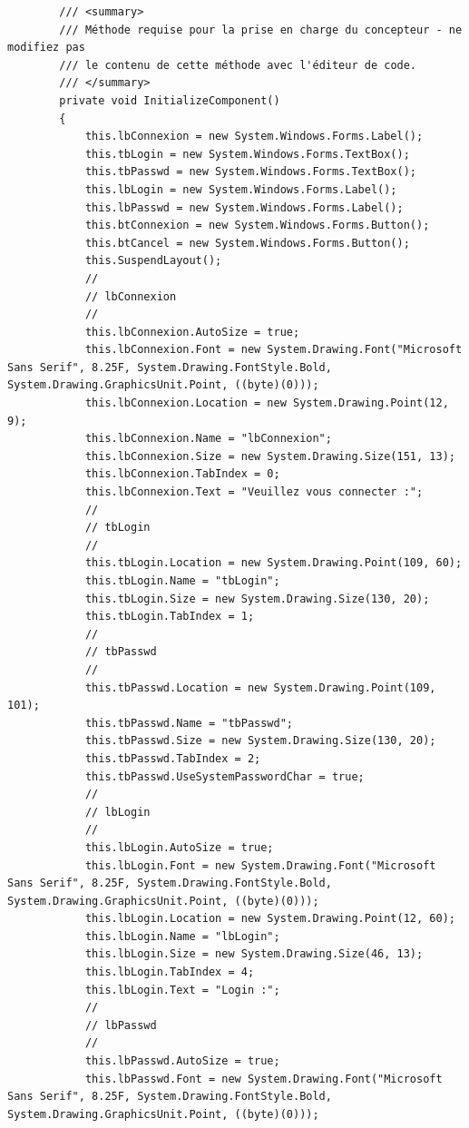 \documentclass[main.tex]{subfiles}
\begin{document}
\begin{lstlisting}
        /// <summary>
        /// Méthode requise pour la prise en charge du concepteur - ne modifiez pas
        /// le contenu de cette méthode avec l'éditeur de code.
        /// </summary>
        private void InitializeComponent()
        {
            this.lbConnexion = new System.Windows.Forms.Label();
            this.tbLogin = new System.Windows.Forms.TextBox();
            this.tbPasswd = new System.Windows.Forms.TextBox();
            this.lbLogin = new System.Windows.Forms.Label();
            this.lbPasswd = new System.Windows.Forms.Label();
            this.btConnexion = new System.Windows.Forms.Button();
            this.btCancel = new System.Windows.Forms.Button();
            this.SuspendLayout();
            // 
            // lbConnexion
            // 
            this.lbConnexion.AutoSize = true;
            this.lbConnexion.Font = new System.Drawing.Font("Microsoft Sans Serif", 8.25F, System.Drawing.FontStyle.Bold, System.Drawing.GraphicsUnit.Point, ((byte)(0)));
            this.lbConnexion.Location = new System.Drawing.Point(12, 9);
            this.lbConnexion.Name = "lbConnexion";
            this.lbConnexion.Size = new System.Drawing.Size(151, 13);
            this.lbConnexion.TabIndex = 0;
            this.lbConnexion.Text = "Veuillez vous connecter :";
            // 
            // tbLogin
            // 
            this.tbLogin.Location = new System.Drawing.Point(109, 60);
            this.tbLogin.Name = "tbLogin";
            this.tbLogin.Size = new System.Drawing.Size(130, 20);
            this.tbLogin.TabIndex = 1;
            // 
            // tbPasswd
            // 
            this.tbPasswd.Location = new System.Drawing.Point(109, 101);
            this.tbPasswd.Name = "tbPasswd";
            this.tbPasswd.Size = new System.Drawing.Size(130, 20);
            this.tbPasswd.TabIndex = 2;
            this.tbPasswd.UseSystemPasswordChar = true;
            // 
            // lbLogin
            // 
            this.lbLogin.AutoSize = true;
            this.lbLogin.Font = new System.Drawing.Font("Microsoft Sans Serif", 8.25F, System.Drawing.FontStyle.Bold, System.Drawing.GraphicsUnit.Point, ((byte)(0)));
            this.lbLogin.Location = new System.Drawing.Point(12, 60);
            this.lbLogin.Name = "lbLogin";
            this.lbLogin.Size = new System.Drawing.Size(46, 13);
            this.lbLogin.TabIndex = 4;
            this.lbLogin.Text = "Login :";
            // 
            // lbPasswd
            // 
            this.lbPasswd.AutoSize = true;
            this.lbPasswd.Font = new System.Drawing.Font("Microsoft Sans Serif", 8.25F, System.Drawing.FontStyle.Bold, System.Drawing.GraphicsUnit.Point, ((byte)(0)));

\end{lstlisting}
\end{document}

